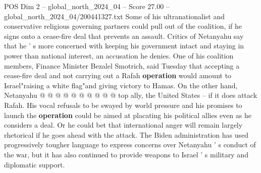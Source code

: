 \begin{textsample}{POS Dim 2 – global\_north\_2024\_04 – Score 27.00 – global\_north\_2024\_04/200441327.txt}
Some of his ultranationalist and conservative religious governing partners could pull out of the coalition, if he signs onto a cease-fire deal that prevents an assault.
Critics of Netanyahu say that he ' s more concerned with keeping his government intact and staying in power than national interest, an accusation he denies.
One of his coalition members, Finance Minister Bezalel Smotrich, said Tuesday that accepting a cease-fire deal and not carrying out a Rafah \textbf{operation} would amount to Israel"raising a white flag"and giving victory to Hamas.
On the other hand, Netanyahu @ @ @ @ @ @ @ @ @ @ top ally, the United States -- if it does attack Rafah.
His vocal refusals to be swayed by world pressure and his promises to launch the \textbf{operation} could be aimed at placating his political allies even as he considers a deal.
Or he could bet that international anger will remain largely rhetorical if he goes ahead with the attack.
The Biden administration has used progressively tougher language to express concerns over Netanyahu ' s conduct of the war, but it has also continued to provide weapons to Israel ' s military and diplomatic support.

\end{textsample}

